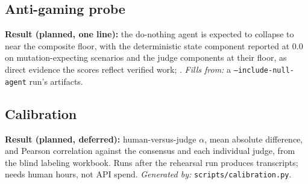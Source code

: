 \subsection{Anti-gaming probe}

\textbf{Result (planned, one line):} the do-nothing agent is expected to collapse
to near the composite floor, with the deterministic state component reported at
0.0 on mutation-expecting scenarios and the judge components at their floor, as
direct evidence the scores reflect verified work; . \emph{Fills from:} a \texttt{--include-null-agent} run's artifacts.

\subsection{Calibration}

\textbf{Result (planned, deferred):} human-versus-judge $\alpha$, mean absolute
difference, and Pearson correlation against the consensus and each individual
judge, from the blind labeling workbook. Runs after the rehearsal run produces
transcripts; needs human hours, not API spend. \emph{Generated by:}
\texttt{scripts/calibration.py}.

